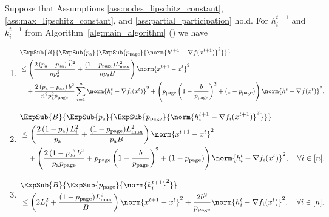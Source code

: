 \documentclass{article}
\newcommand{\algorithmname}{DASHA-PP}
\newcommand*{\probavailable}{\ensuremath{p_{\textnormal{a}}}}
\newcommand*{\probpairaa}{\ensuremath{p_{\textnormal{aa}}}}
\newcommand*{\probpage}{\ensuremath{p_{\text{page}}}}
\begin{document}
\begin{lemma}
  \label{lemma:gradient_page}
  Suppose that Assumptions \ref{ass:nodes_lipschitz_constant}, \ref{ass:max_lipschitz_constant}, and \ref{ass:partial_participation} hold. For $h^{t+1}_i$ and $k^{t+1}_i$ from Algorithm~\ref{alg:main_algorithm} (\algname{\algorithmname-PAGE}) we have
  \begin{enumerate}
  \item
      \begin{align*}
          &\ExpSub{B}{\ExpSub{\probavailable}{\ExpSub{\probpage}{\norm{h^{t+1} - \nabla f(x^{t+1})}^2}}} \\
          & \leq \left(\frac{2 \left(\probavailable - \probpairaa\right) \widehat{L}^2}{n \probavailable^2} + \frac{(1 - \probpage)L_{\max}^2}{n \probavailable B}\right) \norm{x^{t+1} - x^{t}}^2\\
          &\quad + \frac{2\left(\probavailable - \probpairaa\right) b^2}{n^2 \probavailable^2 \probpage}\sum_{i=1}^n\norm{ h^t_i - \nabla f_i(x^{t})}^2 + \left(\probpage\left(1 - \frac{b}{\probpage}\right)^2 + (1 - \probpage)\right)\norm{h^{t} - \nabla f(x^{t})}^2.
      \end{align*}
  \item
      \begin{align*}
          &\ExpSub{B}{\ExpSub{\probavailable}{\ExpSub{\probpage}{\norm{h^{t+1}_i - \nabla f_i(x^{t+1})}^2}}} \\
          & \leq \left(\frac{2\left(1 - \probavailable\right)L_i^2}{\probavailable} + \frac{(1 - \probpage)L_{\max}^2}{\probavailable B}\right) \norm{x^{t+1} - x^{t}}^2 \\
          &\quad +\left(\frac{2\left(1 - \probavailable\right)b^2}{\probavailable \probpage} + \probpage\left(1 - \frac{b}{\probpage}\right)^2 + (1 - \probpage)\right)\norm{h^{t}_i - \nabla f_i(x^{t})}^2, \quad \forall i \in [n].
      \end{align*}
  \item
      \begin{align*}
        &\ExpSub{B}{\ExpSub{\probpage}{\norm{k^{t+1}_i}^2}} \\
        &\leq \left(2 L_i^2 + \frac{(1 - \probpage)L_{\max}^2}{B}\right)\norm{x^{t+1} - x^{t}}^2 +  \frac{2b^2}{\probpage} \norm{h^t_i - \nabla f_i(x^{t})}^2, \quad \forall i \in [n].
      \end{align*}
  \end{enumerate}
\end{lemma}
\end{document}

